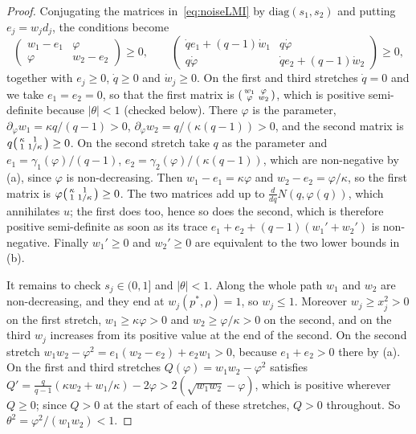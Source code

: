 \documentclass[11pt]{amsart}
\theoremstyle{definition}
\begin{document}
\begin{proof}
Conjugating the matrices in~\eqref{eq:noiseLMI} by $\mathrm{diag}(s_1,s_2)$ and putting $e_j=w_jd_j$, the conditions
become
\[
\begin{pmatrix}w_1-e_1&\varphi\\\varphi&w_2-e_2\end{pmatrix}\ge0,\qquad
\begin{pmatrix}\dot qe_1+(q-1)\dot w_1&q\dot\varphi\\q\dot\varphi&\dot qe_2+(q-1)\dot w_2\end{pmatrix}\ge0,
\]
together with $e_j\ge0$, $\dot q\ge0$ and $\dot w_j\ge0$. On the first and third stretches $\dot q=0$ and we take
$e_1=e_2=0$, so that the first matrix is $\begin{psmallmatrix}w_1&\varphi\\\varphi&w_2\end{psmallmatrix}$, which is
positive semi-definite because $|\theta|<1$ (checked below). There $\varphi$ is the parameter,
$\partial_\varphi w_1=\kappa q/(q-1)>0$, $\partial_\varphi w_2=q/(\kappa(q-1))>0$, and the second matrix is
$q\begin{psmallmatrix}\kappa&1\\1&1/\kappa\end{psmallmatrix}\ge0$. On the second stretch take $q$ as the parameter and
$e_1=\gamma_1(\varphi)/(q-1)$, $e_2=\gamma_2(\varphi)/(\kappa(q-1))$, which are non-negative by (a), since $\varphi$ is
non-decreasing. Then $w_1-e_1=\kappa\varphi$ and $w_2-e_2=\varphi/\kappa$, so the first matrix is
$\varphi\begin{psmallmatrix}\kappa&1\\1&1/\kappa\end{psmallmatrix}\ge0$. The two matrices add up to $\frac{d}{dq}N(q,\varphi(q))$,
which annihilates $u$; the first does too, hence so does the second, which is therefore positive semi-definite as soon
as its trace $e_1+e_2+(q-1)(w_1'+w_2')$ is non-negative. Finally $w_1'\ge0$ and $w_2'\ge0$ are equivalent to the two
lower bounds in (b).

It remains to check $s_j\in(0,1]$ and $|\theta|<1$. Along the whole path $w_1$ and $w_2$ are non-decreasing, and they end
at $w_j(p^*,\rho)=1$, so $w_j\le1$. Moreover $w_j\ge x_j^2>0$ on the first stretch, $w_1\ge\kappa\varphi>0$ and
$w_2\ge\varphi/\kappa>0$ on the second, and on the third $w_j$ increases from its positive value at the end of the
second. On the second stretch $w_1w_2-\varphi^2=e_1(w_2-e_2)+e_2w_1>0$, because $e_1+e_2>0$ there
by (a). On the first and third stretches $Q(\varphi)=w_1w_2-\varphi^2$ satisfies
$Q'=\frac q{q-1}(\kappa w_2+w_1/\kappa)-2\varphi>2(\sqrt{w_1w_2}-\varphi)$, which is positive wherever $Q\ge0$; since
$Q>0$ at the start of each of these stretches, $Q>0$ throughout. So $\theta^2=\varphi^2/(w_1w_2)<1$.
\end{proof}
\end{document}
